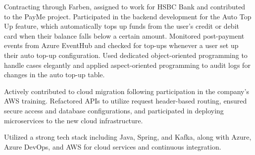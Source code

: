 \begin{cventries}
{\begin{cvitems}
        \item {Contracting through Farben, assigned to work for HSBC Bank and contributed to the PayMe project. Participated in the backend development for the Auto Top Up feature, which automatically tops up funds from the user's credit or debit card when their balance falls below a certain amount. Monitored post-payment events from Azure EventHub and checked for top-ups whenever a user set up their auto top-up configuration. Used dedicated object-oriented programming to handle cases elegantly and applied aspect-oriented programming to audit logs for changes in the auto top-up table.}
        \item {Actively contributed to cloud migration following participation in the company's AWS training. Refactored APIs to utilize request header-based routing, ensured secure access and database configurations, and participated in deploying microservices to the new cloud infrastructure.}
        \item {Utilized a strong tech stack including Java, Spring, and Kafka, along with Azure, Azure DevOps, and AWS for cloud services and continuous integration.}
      \end{cvitems}
    }


\end{cventries}
